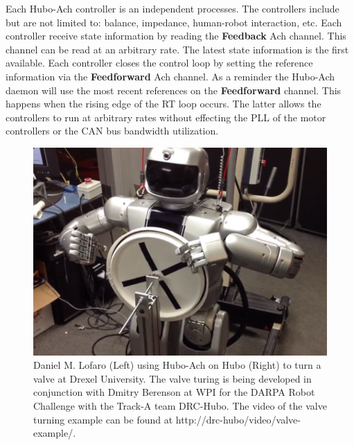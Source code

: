 Each Hubo-Ach controller is an independent processes.
The controllers include but are not limited to: balance, impedance, human-robot interaction, etc.
Each controller receive state information by reading the \textbf{Feedback} Ach channel.
This channel can be read at an arbitrary rate.
The latest state information is the first available.
Each controller closes the control loop by setting the reference information via the \textbf{Feedforward} Ach channel.
As a reminder the Hubo-Ach daemon will use the most recent references on the \textbf{Feedforward} channel.
This happens when the rising edge of the RT loop occurs.
The latter allows the controllers to run at arbitrary rates without effecting the PLL of the motor controllers or the CAN bus bandwidth utilization.

\begin{figure}[thpb]
  \centering
\includegraphics[width=1.0\columnwidth]{./pix/hubo_valve.png}
  \caption{Daniel M. Lofaro (Left) using Hubo-Ach on Hubo (Right) to turn a valve at Drexel University.  
The valve turing is being developed in conjunction with Dmitry Berenson at WPI for the DARPA Robot Challenge with the Track-A team DRC-Hubo.
The video of the valve turning example can be found at http://drc-hubo/video/valve-example/.}
  \label{fig:valve}
\end{figure}

